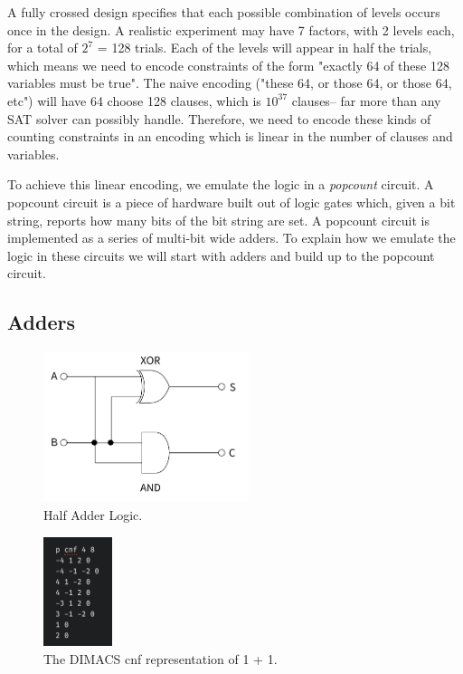 A fully crossed design specifies that each possible combination of levels occurs once in the design. A realistic experiment may have 7 factors, with 2 levels each, for a total of $2^7$ = 128 trials. Each of the levels will appear in half the trials, which means we need to encode constraints of the form "exactly 64 of these 128 variables must be true". The naive encoding ("these 64, or those 64, or those 64, etc") will have 64 choose 128 clauses, which is $10^{37}$ clauses-- far more than any SAT solver can possibly handle. Therefore, we need to encode these kinds of counting constraints in an encoding which is linear in the number of clauses and variables.

To achieve this linear encoding, we emulate the logic in a \emph{popcount} circuit. A popcount circuit is a piece of hardware built out of logic gates which, given a bit string, reports how many bits of the bit string are set. A popcount circuit is implemented as a series of multi-bit wide adders. To explain how we emulate the logic in these circuits we will start with adders and build up to the popcount circuit.

\subsection{Adders}

\begin{figure}[t]
    \centerline{\includegraphics[origin=c,width=6cm]{fig_half_adder}}
    \caption{Half Adder Logic.}%
    \label{fig:half_adder}%
\end{figure}

\begin{figure}[t]
    \centerline{\includegraphics[origin=c,width=2cm]{fig_one_plus_one_cnf}}
    \caption{The DIMACS cnf representation of 1 + 1.}%
    \label{fig:one_plus_one_cnf}%
\end{figure}

